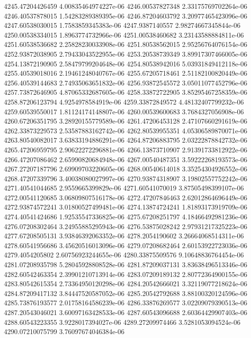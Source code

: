 {4245.47204426459 4.00835464974227e-06
4246.00537827348 2.33175769702264e-06
4246.40537878015 1.54283289389395e-06
4246.87204603792 3.20977465423096e-06
4247.60538030015 1.7583859345383e-06
4247.9387140557 2.98274667345844e-06
4250.00538334015 1.8963774732966e-06
4251.00538460682 3.23143588884811e-06
4251.60538536682 2.25828230033908e-06
4251.80538562015 2.95256764076154e-06
4252.93872038905 2.79433043522955e-06
4253.20538739349 3.89917307466005e-06
4254.13872190905 2.58479799204648e-06
4254.80538942016 5.03931849412118e-06
4255.40539018016 2.19461248040767e-06
4255.67205718461 2.51182100820449e-06
4256.40539144683 2.74935063651832e-06
4256.93872545572 3.05011077452796e-06
4257.73872646905 4.87065332687605e-06
4258.33872722905 3.85295467258359e-06
4258.87206123794 4.9254978584919e-06
4259.33872849572 4.48132407799232e-06
4259.60539550017 1.81124174148807e-06
4260.00539600683 3.7684327056908e-06
4260.67206351795 3.28920155779589e-06
4261.47206453128 2.47107660291619e-06
4262.33873229573 2.53587883162742e-06
4262.80539955351 4.05306589870071e-06
4263.80540082017 3.63833194886291e-06
4264.87206883795 2.03222878842732e-06
4265.47206959795 2.90622272296881e-06
4266.13873710907 2.91391733812922e-06
4266.47207086462 2.65990820684948e-06
4267.00540487351 3.59222268193573e-06
4267.27207187796 2.69909703220605e-06
4268.00540614018 3.35254304926552e-06
4268.47207339796 3.40038080027997e-06
4270.93874318907 3.19802557752242e-06
4271.40541044685 2.9559665399829e-06
4271.60541070019 3.87505498399107e-06
4272.00541120685 3.06809807516178e-06
4272.47207846463 2.62012864696449e-06
4272.93874572241 3.01800527499481e-06
4274.13874724241 1.81893173919709e-06
4274.40541424686 1.92535547336825e-06
4275.67208251797 4.18466492981236e-06
4276.07208302464 3.24955885295943e-06
4276.53875028242 2.97931217325223e-06
4277.67208505131 3.93846392063352e-06
4278.2054190602 3.26664068514311e-06
4278.60541956686 3.45620516013096e-06
4279.07208682464 2.60153922723036e-06
4279.4054205802 2.60756923244655e-06
4280.33875509576 9.10648836764454e-06
4281.07208935798 5.28045928808528e-06
4281.87209037131 3.83638496513346e-06
4282.60542463354 2.39901210713914e-06
4283.07209189132 2.80772364900155e-06
4283.80542615354 2.73364950120298e-06
4284.20542666021 3.32119077218624e-06
4284.87209417132 3.84447520587052e-06
4285.20542792688 3.88100320124596e-06
4285.73876193577 2.01758164586239e-06
4286.33876269577 3.02209079390513e-06
4287.20543046021 3.60097163428533e-06
4287.60543096688 2.60364429907403e-06
4288.60543223355 3.9228017394027e-06
4289.27209974466 3.5281053094524e-06
4290.07210075799 3.76097674046384e-06
}
